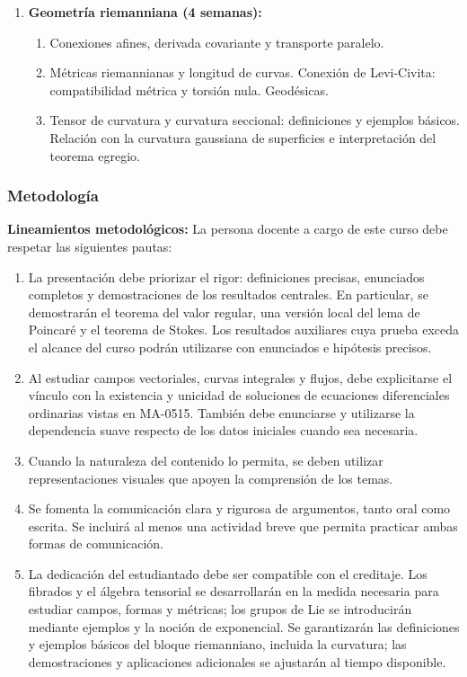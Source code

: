 \begin{refsection}
\begin{enumerate}
\item \textbf{Geometría riemanniana (4 semanas):}
\begin{enumerate}
    \item Conexiones afines, derivada covariante y transporte paralelo.
    \item Métricas riemannianas y longitud de curvas. Conexión de Levi-Civita: compatibilidad métrica y torsión nula. Geodésicas.
    \item Tensor de curvatura y curvatura seccional: definiciones y ejemplos básicos. Relación con la curvatura gaussiana de superficies e interpretación del teorema egregio.
\end{enumerate}

\end{enumerate}

\subsubsection*{Metodología}

\noindent \textbf{Lineamientos metodológicos:} La persona docente a cargo de este curso debe respetar las siguientes pautas:
\begin{enumerate}
    \item La presentación debe priorizar el rigor: definiciones precisas, enunciados completos y demostraciones de los resultados centrales. En particular, se demostrarán el teorema del valor regular, una versión local del lema de Poincaré y el teorema de Stokes. Los resultados auxiliares cuya prueba exceda el alcance del curso podrán utilizarse con enunciados e hipótesis precisos.
    \item Al estudiar campos vectoriales, curvas integrales y flujos, debe explicitarse el vínculo con la existencia y unicidad de soluciones de ecuaciones diferenciales ordinarias vistas en MA-0515. También debe enunciarse y utilizarse la dependencia suave respecto de los datos iniciales cuando sea necesaria.
    \item Cuando la naturaleza del contenido lo permita, se deben utilizar representaciones visuales que apoyen la comprensión de los temas.
    \item Se fomenta la comunicación clara y rigurosa de argumentos, tanto oral como escrita. Se incluirá al menos una actividad breve que permita practicar ambas formas de comunicación.
  \item La dedicación del estudiantado debe ser compatible con el creditaje. Los fibrados y el álgebra tensorial se desarrollarán en la medida necesaria para estudiar campos, formas y métricas; los grupos de Lie se introducirán mediante ejemplos y la noción de exponencial. Se garantizarán las definiciones y ejemplos básicos del bloque riemanniano, incluida la curvatura; las demostraciones y aplicaciones adicionales se ajustarán al tiempo disponible.
\end{enumerate}


\end{refsection}
